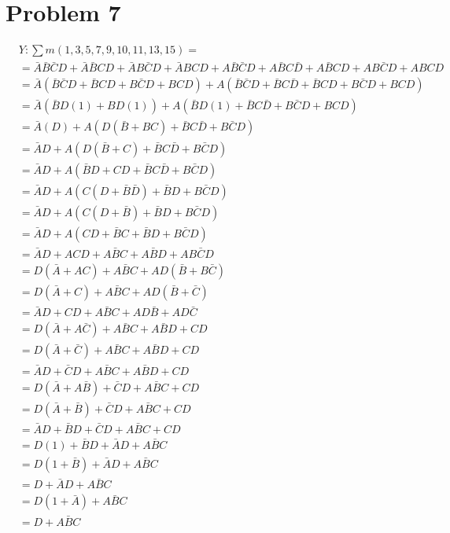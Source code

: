 \documentclass{article}
\begin{document}
    \newpage
    \section{Problem 7}
    \begin{align*}
        &Y: \sum m (1, 3, 5, 7, 9, 10, 11, 13, 15) =\\ 
        &=\bar{A}\bar{B}\bar{C}D + \bar{A}\bar{B}CD + \bar{A}B\bar{C}D + \bar{A}BCD + A\bar{B}\bar{C}D + A\bar{B}C\bar{D} + A\bar{B}CD + AB\bar{C}D + ABCD \\
        &= \bar{A}(\bar{B}\bar{C}D + \bar{B}CD + B\bar{C}D + BCD) + A(\bar{B}\bar{C}D + \bar{B}C\bar{D} + \bar{B}CD + B\bar{C}D + BCD) \\
        &= \bar{A}(\bar{B}D(1) + BD(1)) + A(\bar{B}D(1) +\bar{B}C\bar{D} + B\bar{C}D + BCD) \\
        &= \bar{A}(D) + A(D(\bar{B} + BC) + \bar{B}C\bar{D} + B\bar{C}D) \\
        &= \bar{A}D + A(D(\bar{B} + C) + \bar{B}C\bar{D} + B\bar{C}D) \\
        &= \bar{A}D + A(\bar{B}D + CD + \bar{B}C\bar{D} + B\bar{C}D) \\
        &=\bar{A}D + A(C(D + \bar{B}\bar{D})+ \bar{B}D + B\bar{C}D) \\
        &= \bar{A}D + A(C(D + \bar{B}) + \bar{B}D + B\bar{C}D) \\
        &= \bar{A}D + A(CD + \bar{B}C + \bar{B}D + B\bar{C}D) \\
        &= \bar{A}D+ ACD + A\bar{B}C + A\bar{B}D + AB\bar{C}D \\
        &= D(\bar{A} + AC) + A\bar{B}C + AD(\bar{B} + B\bar{C}) \\
        &= D(\bar{A} + C) + A\bar{B}C + AD(\bar{B} + \bar{C}) \\
        &= \bar{A}D + CD + A\bar{B}C + AD\bar{B} + AD\bar{C} \\
        &= D(\bar{A} + A\bar{C}) + A\bar{B}C + A\bar{B}D + CD\\
        &= D(\bar{A} + \bar{C}) + A\bar{B}C + A\bar{B}D + CD\\
        &= \bar{A}D + \bar{C}D + A\bar{B}C + A\bar{B}D + CD\\
        &= D(\bar{A} + A\bar{B}) + \bar{C}D + A\bar{B}C + CD\\
        &= D(\bar{A} + \bar{B}) + \bar{C}D + A\bar{B}C + CD\\
        &= \bar{A}D + \bar{B}D + \bar{C}D + A\bar{B}C + CD\\
        &= D(1) + \bar{B}D + \bar{A}D + A\bar{B}C \\
        &= D(1 + \bar{B}) + \bar{A}D + A\bar{B}C \\
        &= D + \bar{A}D + A\bar{B}C \\
        &= D(1 + \bar{A}) + A\bar{B}C \\
        &= D + A\bar{B}C
    \end{align*}
\end{document}
